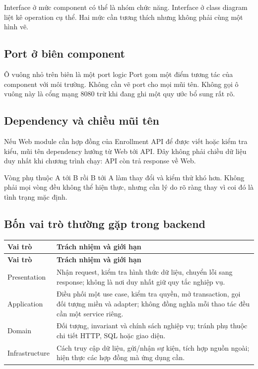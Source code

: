 Interface ở mức component có thể là nhóm chức năng. Interface ở class diagram liệt kê operation cụ thể. Hai mức cần tương thích nhưng không phải cùng một hình vẽ.

\subsection{Port ở biên component}
  {Ô vuông nhỏ trên biên là một port logic}
Port gom một điểm tương tác của component với môi trường. Không cần vẽ port cho mọi mũi tên. Không gọi ô vuông này là cổng mạng 8080 trừ khi đang ghi một quy ước bổ sung rất rõ.

\subsection{Dependency và chiều mũi tên}
Nếu Web module cần hợp đồng của Enrollment API để được viết hoặc kiểm tra kiểu, mũi tên dependency hướng từ Web tới API. Đây không phải chiều dữ liệu duy nhất khi chương trình chạy: API còn trả response về Web.

Vòng phụ thuộc A tới B rồi B tới A làm thay đổi và kiểm thử khó hơn. Không phải mọi vòng đều không thể hiện thực, nhưng cần lý do rõ ràng thay vì coi đó là tình trạng mặc định.

\subsection{Bốn vai trò thường gặp trong backend}
\begin{longtable}{|L{31mm}|L{111mm}|}\hline
\textbf{Vai trò} & \textbf{Trách nhiệm và giới hạn}\\\hline
\endfirsthead
\hline
\textbf{Vai trò} & \textbf{Trách nhiệm và giới hạn}\\\hline
\endhead
Presentation & Nhận request, kiểm tra hình thức dữ liệu, chuyển lỗi sang response; không là nơi duy nhất giữ quy tắc nghiệp vụ.\\\hline
Application & Điều phối một use case, kiểm tra quyền, mở transaction, gọi đối tượng miền và adapter; không đồng nghĩa mỗi thao tác đều cần một service riêng.\\\hline
Domain & Đối tượng, invariant và chính sách nghiệp vụ; tránh phụ thuộc chi tiết HTTP, SQL hoặc giao diện.\\\hline
Infrastructure & Cách truy cập dữ liệu, gửi/nhận sự kiện, tích hợp nguồn ngoài; hiện thực các hợp đồng mà ứng dụng cần.\\\hline
\end{longtable}

